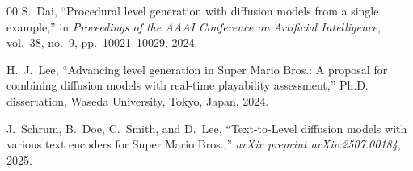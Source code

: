 \documentclass[conference]{IEEEtran}
\begin{document}
\begin{thebibliography}{00}
S.~Dai, ``Procedural level generation with diffusion models from a single example,'' in \textit{Proceedings of the AAAI Conference on Artificial Intelligence}, vol.~38, no.~9, pp.~10021--10029, 2024.

H.~J.~Lee, ``Advancing level generation in Super Mario Bros.: A proposal for combining diffusion models with real-time playability assessment,'' Ph.D. dissertation, Waseda University, Tokyo, Japan, 2024.

J.~Schrum, B.~Doe, C.~Smith, and D.~Lee, ``Text-to-Level diffusion models with various text encoders for Super Mario Bros.,'' \textit{arXiv preprint arXiv:2507.00184}, 2025.

\end{thebibliography}
\end{document}
